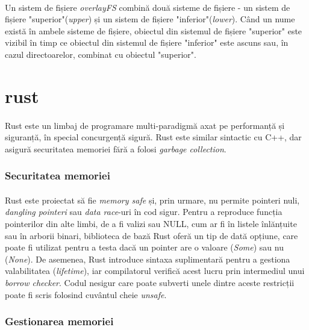        \paragraph{} Un sistem de fișiere \textit{overlayFS} combină două sisteme de fișiere - un sistem de fișiere "superior"(\textit{upper}) și un sistem de fișiere "inferior"(\textit{lower}). Când un nume există în ambele sisteme de fișiere, obiectul din sistemul de fișiere "superior" este vizibil în timp ce obiectul din sistemul de fișiere "inferior" este ascuns sau, în cazul directoarelor, combinat cu obiectul "superior". \cite{ofs:kernel}

\section{rust}
\paragraph{} Rust este un limbaj de programare multi-paradigmă axat pe performanță și siguran\-ță, în special concurgență sigură. Rust este similar sintactic cu C++, dar asigură securitatea memoriei fără a folosi \textit{garbage collection}. \cite{wiki:rust}

    \subsubsection{Securitatea memoriei}
        \paragraph{} Rust este proiectat să fie \textit{memory safe} și, prin urmare, nu permite pointeri nuli, \textit{dangling pointeri} sau \textit{data race}-uri în cod sigur. Pentru a reproduce funcția pointerilor din alte limbi, de a fi valizi sau NULL, cum ar fi în listele înlănțuite sau în arborii binari, biblioteca de bază Rust oferă un tip de dată opțiune, care poate fi utilizat pentru a testa dacă un pointer are o valoare (\textit{Some}) sau nu (\textit{None}). De asemenea, Rust introduce sintaxa suplimentară pentru a gestiona valabilitatea (\textit{lifetime}), iar compilatorul verifică acest lucru prin intermediul unui \textit{borrow checker}. Codul nesigur care poate subverti unele dintre aceste restricții poate fi scris folosind cuvântul cheie \textit{unsafe}. \cite{wiki:rust}

    \subsubsection{Gestionarea memoriei}
